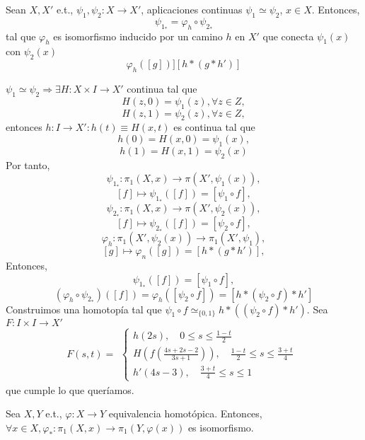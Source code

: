 \begin{lem}
  Sean $X, X'$ e.t., $\psi_{1}, \psi_{2} : X \to X' $, aplicaciones continuas $\psi_{1} \simeq \psi_{2}$, $x \in X$. Entonces,
  \[
    \psi_{1}_* = \varphi_{h} \circ \psi_{2}_*
  \]
  tal que $\varphi_{h}$ es isomorfismo inducido por un camino $h$ en $X'$ que conecta $\psi_{1}(x)$ con $\psi_{2}(x)$
  \[ 
    \varphi_{h}([g]) ] [h * (g * h')] 
  \] 
\end{lem}

\begin{dem}
  $\psi_{1} \simeq \psi_{2} \Rightarrow \exists H  : X \times I \to X'$ continua tal que
  \[ 
    H(z,0) = \psi_{1}(z), \forall z \in Z, 
  \] 
  \[ 
    H(z,1) = \psi_{2}(z), \forall z \in Z,
  \] 
  entonces $h : I \to X': h(t) \equiv H(x, t)$ es continua tal que
  \[ 
    h(0) = H(x, 0) = \psi_{1}(x),
  \] 
  \[ 
    h(1) = H(x, 1) = \psi_{2}(x)
  \] 
  Por tanto,
  \[
    \psi_{1}_*  :  \pi_{1}(X, x) \to \pi(X', \psi_{1}(x)),
  \]
  \[ 
    [f] \mapsto \psi_{1}_*([f]) = [\psi_{1} \circ f],
  \] 
  \[
    \psi_{2}_*  :  \pi_{1}(X, x) \to \pi(X', \psi_{2}(x)),
  \]
  \[ 
    [f] \mapsto \psi_{2}_*([f]) = [\psi_{2} \circ f],
  \] 
  \[ 
    \varphi_{h} : \pi_{1}(X', \psi_{2}(x)) \to \pi_{1}(X', \psi_{1}),
  \] 
  \[ 
    [g] \mapsto \varphi_{n}([g]) = [h * (g * h')],
  \] 
  Entonces,
  \[
    \psi_{1}_*([f]) = [\psi_{1} \circ f],
  \]
  \[ 
   (\varphi_{h} \circ \psi_{2}_*)([f]) = \varphi_{h}([\psi_{2} \circ f]) = [h * (\psi_{2} \circ f) * h']
  \] 
  Construimos una homotopía tal que $\psi_{1} \circ f \simeq_{\{ 0, 1 \}} h * ((\psi_{2} \circ f) * h')$. Sea $F : I \times I \to X'$
  \[ 
    F(s, t) =
    \begin{aligned}
      \begin{cases}
        h(2s), \quad 0 \leq s \leq \frac{1 - t}{2} \\
        H(f(\frac{4s + 2s - 2}{3s + 1})), \quad \frac{1 - t}{2} \leq s \leq \frac{3 + t}{4} \\
        h'(4s - 3), \quad \frac{3 + t}{4} \leq s \leq 1
      \end{cases}
    \end{aligned}
  \] 
  que cumple lo que queríamos.
\end{dem}

\begin{prop}
  Sea $X, Y$ e.t., $\varphi : X \to Y $ equivalencia homotópica. Entonces, $\forall x \in X, \varphi_* : \pi_{1}(X, x) \to \pi_{1}(Y, \varphi(x))$ es isomorfismo.
\end{prop}

